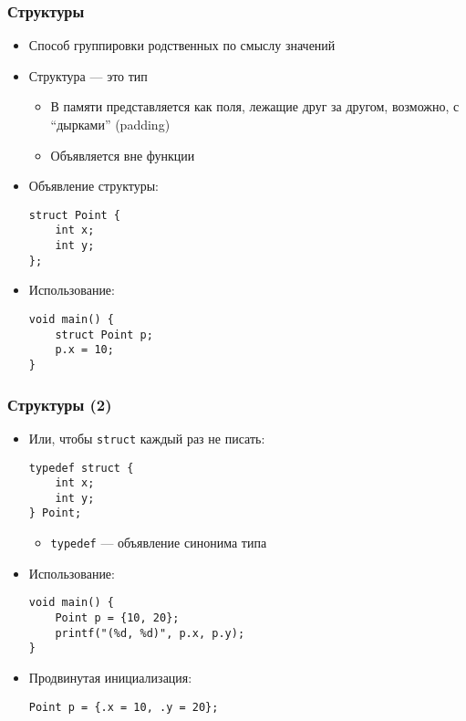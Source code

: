 \documentclass{../../slides-style}
\begin{document}
    
    \begin{frame}[plain]
        \titlepage
    \end{frame}
    
    \begin{frame}[fragile]
        \frametitle{Структуры}
        \begin{itemize}
            \item Способ группировки родственных по смыслу значений
            \item Структура --- это тип
            \begin{itemize}
                \item В памяти представляется как поля, лежащие друг за другом, возможно, с ``дырками'' (padding)
                \item Объявляется вне функции
            \end{itemize}
            \item Объявление структуры:
            \begin{verbatim}
struct Point {
    int x;
    int y;
};
            \end{verbatim}
            \item Использование:
            \begin{verbatim}
void main() {
    struct Point p;
    p.x = 10;
}
            \end{verbatim}
        \end{itemize}
    \end{frame}

    \begin{frame}[fragile]
        \frametitle{Структуры (2)}
        \begin{itemize}
            \item Или, чтобы \texttt{struct} каждый раз не писать:
            \begin{verbatim}
typedef struct {
    int x;
    int y;
} Point;
            \end{verbatim}
            \begin{itemize}
                \item \texttt{typedef} --- объявление синонима типа
            \end{itemize}
            \item Использование:
            \begin{verbatim}
void main() {
    Point p = {10, 20};
    printf("(%d, %d)", p.x, p.y);
}
            \end{verbatim}
            \item Продвинутая инициализация:
            \begin{verbatim}
Point p = {.x = 10, .y = 20};
            \end{verbatim}
        \end{itemize}
    \end{frame}
\end{document}
